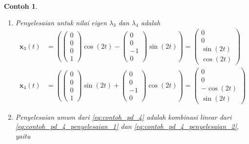 \documentclass[a4paper]{article}
\theoremstyle{definisi}
\newtheorem{contoh}{Contoh}[section]
\numberwithin{equation}{section}
\begin{document}
\begin{contoh}
\begin{enumerate}[label=Langkah \arabic*: ,leftmargin=*]
      \item Penyelesaian untuk nilai eigen $\lambda_3$ dan $\lambda_4$ adalah
      \begin{equation}\label{eq:contoh_pd_4_penyelesaian_2}
        \begin{split}
          \mathbf{x}_3(t) &= \left(\begin{pmatrix}0\\0\\0\\1\end{pmatrix}\cos(2t) - \begin{pmatrix}0\\0\\-1\\0\end{pmatrix}\sin(2t)\right) = \begin{pmatrix}0\\0\\\sin(2t)\\ \cos(2t)\end{pmatrix}\\
          \mathbf{x}_4(t) &= \left(\begin{pmatrix}0\\0\\0\\1\end{pmatrix}\sin(2t) + \begin{pmatrix}0\\0\\-1\\0\end{pmatrix}\cos(2t)\right) = \begin{pmatrix}0\\0\\-\cos(2t)\\ \sin(2t)\end{pmatrix}
        \end{split}
      \end{equation}
      \item Penyelesaian umum dari \eqref{eq:contoh_pd_4} adalah kombinasi linear dari \eqref{eq:contoh_pd_4_penyelesaian_1} dan \eqref{eq:contoh_pd_4_penyelesaian_2}, yaitu

\end{enumerate}
\end{contoh}
\end{document}
